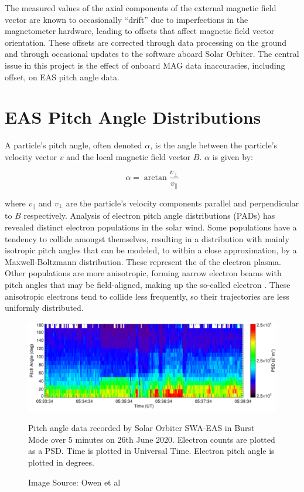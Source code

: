 The measured values of the axial components of the external magnetic field vector are known to occasionally “drift” due to imperfections in the magnetometer hardware, leading to offsets that affect magnetic field vector orientation. These offsets are corrected through data processing on the ground and through occasional updates to the software aboard Solar Orbiter\cite{horbury2020}. The central issue in this project is the effect of onboard MAG data inaccuracies, including offset, on EAS pitch angle data. 

\section{EAS Pitch Angle Distributions} \label{EAS PAD}
A particle's pitch angle, often denoted \(\alpha\), is the angle between the particle's velocity vector \(v\) and the local magnetic field vector \(B\). \(\alpha\) is given by:

\begin{equation} \label{eq: pitch angle}
    \alpha=\arctan{\frac{v_\perp}{v_\parallel}}
\end{equation}

where \(v_\parallel\) and \(v_\perp\) are the particle's velocity components parallel and perpendicular to \(B\) respectively\cite{pilipp1987}. Analysis of electron pitch angle distributions (PADs) has revealed distinct electron populations in the solar wind. Some populations have a tendency to collide amongst themselves, resulting in a  distribution with mainly isotropic pitch angles that  can be modeled, to within a close approximation, by a Maxwell-Boltzmann distribution. These represent the  of the electron plasma. Other populations are more anisotropic, forming narrow electron beams with pitch angles that may be field-aligned, making up the so-called  electron . These anisotropic electrons tend to collide less frequently, so their trajectories are less uniformly distributed\cite{pilipp1987}\cite{marsch2006}.
\\

\begin{figure}[h!]
    \centering
    \centerfloat
    \includegraphics[width=1.1\linewidth]{figures/PADexample.png}
    \caption{Pitch angle data recorded by Solar Orbiter SWA-EAS in Burst Mode over 5 minutes on 26th June 2020\cite{owen2021}. Electron counts are plotted as a PSD. Time is plotted in Universal Time. Electron pitch angle is plotted in degrees.}
    \caption*{Image Source: Owen et al\cite{owen2021}}
    \label{fig: PAD example}
\end{figure}

